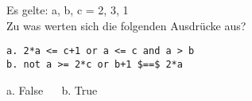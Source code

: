 \question[2]
Es gelte: a, b, c = 2, 3, 1  \\
Zu was werten sich die folgenden Ausdrücke aus?
\begin{lstlisting}
a. 2*a <= c+1 or a <= c and a > b
b. not a >= 2*c or b+1 $==$ 2*a
\end{lstlisting}

\begin{solutionbox}{1cm}
a. False ~~ b. True
\end{solutionbox}
